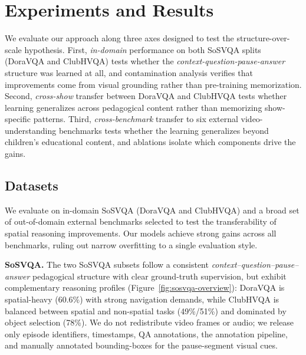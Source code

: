 \documentclass{article}
\begin{document}
\quality
\section{Experiments and Results}
We evaluate our approach along three axes designed to test the structure-over-scale hypothesis. First, \textit{in-domain} performance on both SoSVQA splits (DoraVQA and ClubHVQA) tests whether the \textit{context-question-pause-answer} structure was learned at all, and contamination analysis verifies that improvements come from visual grounding rather than pre-training memorization. Second, \textit{cross-show} transfer between DoraVQA and ClubHVQA tests whether learning generalizes across pedagogical content rather than memorizing show-specific patterns. Third, \textit{cross-benchmark} transfer to six external video-understanding benchmarks tests whether the learning generalizes beyond children's educational content, and ablations isolate which components drive the gains.



\vspace{-0.1cm}
\subsection{Datasets}
\vspace{-0.1cm}
We evaluate on in-domain SoSVQA (DoraVQA and ClubHVQA) and a broad set of out-of-domain external benchmarks selected to test the transferability of spatial reasoning improvements. Our models achieve strong gains across all benchmarks, ruling out narrow overfitting to a single evaluation style. 

\noindent\textbf{SoSVQA.} The two SoSVQA subsets follow a consistent
\textit{context--question--pause--answer} pedagogical structure with clear
ground-truth supervision, but exhibit complementary reasoning profiles
(Figure~\ref{fig:sosvqa-overview}): DoraVQA is spatial-heavy (60.6\%) with
strong navigation demands, while ClubHVQA is balanced between spatial and
non-spatial tasks (49\%/51\%) and dominated by object selection (78\%).
We do not redistribute video frames or audio; we release only episode
identifiers, timestamps, QA annotations, the annotation pipeline, and
manually annotated bounding-boxes for the pause-segment visual cues.
\end{document}
